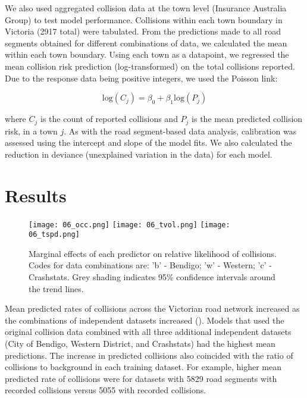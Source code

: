 We also used aggregated collision data at the town level (Insurance Australia Group) to test model performance. Collisions within each town boundary in Victoria (2917 total) were tabulated. From the predictions made to all road segments obtained for different combinations of data, we calculated the mean within each town boundary. Using each town as a datapoint, we regressed the mean collision risk prediction (log-transformed) on the total collisions reported. Due to the response data being positive integers, we used the Poisson link:

\begin{equation} \label{eq:62}
\text{log}(C_j) = \beta_0 + \beta_1\text{log}(P_j)
\end{equation}

\noindent where $C_j$ is the count of reported collisions and $P_j$ is the mean predicted collision risk, in a town $j$. As with the road segment-based data analysis, calibration was assessed using the intercept and slope of the model fits. We also calculated the reduction in deviance (unexplained variation in the data) for each model.

\section{Results}

\begin{figure*}[htp]
  \centering
  \texttt{[image: 06\_occ.png]}
  \texttt{[image: 06\_tvol.png]}
  \texttt{[image: 06\_tspd.png]}
  \caption[Marginal effects of predictor variables on relative likelihood of collision using independent datasets to train models]{Marginal effects of each predictor on relative likelihood of collisions. Codes for data combinations are: 'b' - Bendigo; 'w' - Western; 'c' - Crashstats. Grey shading indicates 95\% confidence intervals around the trend lines.}
  \label{val_effects}
\end{figure*}

Mean predicted rates of collisions across the Victorian road network increased as the combinations of independent datasets increased (). Models that used the original collision data combined with all three additional independent datasets (City of Bendigo, Western District, and Crashstats) had the highest mean predictions. The increase in predicted collisions also coincided with the ratio of collisions to background in each training dataset. For example, higher mean predicted rate of collisions were for datasets with 5829 road segments with recorded collisions versus 5055 with recorded collisions.

